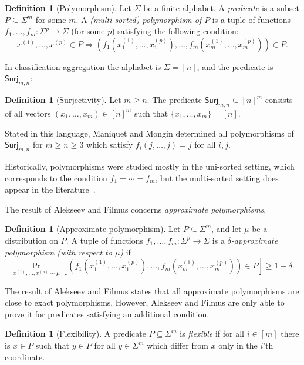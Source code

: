 \documentclass{article}
\providecommand{\Surj}{\mathsf{Surj}}
\theoremstyle{definition}
\newtheorem{definition}[theorem]{Definition}
\theoremstyle{remark}
\begin{document}
\begin{definition}[Polymorphism] \label{def:polymorphism}
Let $\Sigma$ be a finite alphabet. A \emph{predicate} is a subset $P \subseteq \Sigma^m$ for some $m$. A \emph{(multi-sorted) polymorphism of $P$} is a tuple of functions $f_1,\dots,f_m\colon \Sigma^p \to \Sigma$ (for some $p$) satisfying the following condition:
\[
x^{(1)},\dots,x^{(p)} \in P \Longrightarrow
(f_1(x^{(1)}_1, \dots, x^{(p)}_1),\dots,f_m(x^{(1)}_m,\dots,x^{(p)}_m)) \in P.
\]
\end{definition}

In classification aggregation the alphabet is $\Sigma = [n]$, and the predicate is $\Surj_{m,n}$:

\begin{definition}[Surjectivity]
\label{def:surj}
Let $m \ge n$. The predicate $\Surj_{m,n} \subseteq [n]^m$ consists of all vectors $(x_1,\dots,x_m) \in [n]^m$ such that $\{x_1,\dots,x_m\} = [n]$.
\end{definition}

Stated in this language, Maniquet and Mongin determined all polymorphisms of $\Surj_{m,n}$ for $m \ge n \ge 3$ which satisfy $f_i(j,\dots,j) = j$ for all $i,j$.

Historically, polymorphisms were studied mostly in the uni-sorted setting, which corresponds to the condition $f_1 = \cdots = f_m$, but the multi-sorted setting does appear in the literature~\cite{BulatovJeavons03}.

The result of Alekseev and Filmus concerns \emph{approximate polymorphisms}.

\begin{definition}[Approximate polymorphism]
\label{def:approximate-polymorphism}
Let $P \subseteq \Sigma^m$, and let $\mu$ be a distribution on $P$. A tuple of functions $f_1,\dots,f_m\colon \Sigma^p \to \Sigma$ is a \emph{$\delta$-approximate polymorphism (with respect to $\mu$)} if
\[
 \Pr_{x^{(1)},\dots,x^{(p)} \sim \mu}[(f_1(x^{(1)}_1, \dots, x^{(p)}_1),\dots,f_m(x^{(1)}_m,\dots,x^{(p)}_m)) \in P] \ge 1 - \delta.
\]
\end{definition}

The result of Alekseev and Filmus states that all approximate polymorphisms are close to exact polymorphisms. However, Alekseev and Filmus are only able to prove it for predicates satisfying an additional condition.

\begin{definition}[Flexibility]
\label{def:flexible}
A predicate $P \subseteq \Sigma^m$ is \emph{flexible} if for all $i \in [m]$ there is $x \in P$ such that $y \in P$ for all $y \in \Sigma^m$ which differ from $x$ only in the $i$'th coordinate.
\end{definition}
\end{document}
